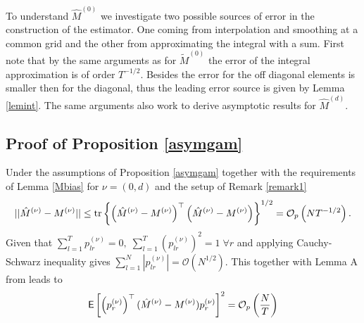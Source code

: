 To understand $\hat{M}^{(0)}$ we investigate two possible sources of error in the construction of the estimator. One coming from interpolation and smoothing at a common grid  and the other from approximating the integral with a sum. First note that by the same arguments as for $\tilde{M}^{(0)}$ the error of the integral approximation is of order $T^{-1/2}$. Besides the error for the off diagonal elements is smaller then for the diagonal, thus the leading error source is given by  Lemma \ref{lemint}. The same arguments also work to derive asymptotic results for $\hat{M}^{(d)}$. %

%

\subsection{Proof of Proposition \ref{asymgam}}\label{proof24}
Under the assumptions of Proposition \ref{asymgam} together with the requirements of Lemma \ref{Mbias} for $\nu=(0,d)$ and the setup of Remark \ref{remark1}%
\begin{equation}
\begin{split}
||\hat{M}^{(\nu)}-M^{(\nu)}||  
\leq \operatorname{tr} \left\{ \left(\hat{M}^{(\nu)}-M^{(\nu)}\right)^{\top}\left(\hat{M}^{(\nu)}-M^{(\nu)}\right) \right\}^{1/2} =\mathcal{O}_p\left(NT^{-1/2}\right).
\end{split}
\end{equation}
Given that $\sum_{l=1}^T p^{(\nu)}_{lr}=0, \; \sum_{l=1}^T \left(p^{(\nu)}_{lr}\right)^2=1 \; \forall r$ and applying Cauchy-Schwarz inequality gives $\sum_{l=1}^N |p^{(\nu)}_{lr}|=\mathcal{O}\left(N^{1/2}\right)$. This together with Lemma A from \cite{Kneip2001} leads to
\begin{equation}
\label{prMpr}
\mathop{\mbox{\sf E}} \left[\left( p^{(\nu)}_r\right)^{\top}(\hat{M}^{(\nu)}-M^{(\nu)})p^{(\nu)}_r\right]^2  = \mathcal{O}_p\left(\frac{N}{T}\right)
\end{equation}

